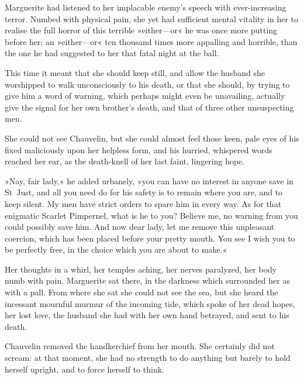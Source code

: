 Marguerite had listened to her implacable enemy's speech with ever-increasing terror. Numbed with physical pain, she yet had sufficient mental vitality in her to realise the full horror of this terrible »either\allowbreak---\allowbreak or« he was once more putting before her; an »either\allowbreak---\allowbreak or« ten thousand times more appalling and horrible, than the one he had suggested to her that fatal night at the ball.

This time it meant that she should keep still, and allow the husband she worshipped to walk unconsciously to his death, or that she should, by trying to give him a word of warning, which perhaps might even be unavailing, actually give the signal for her own brother's death, and that of three other unsuspecting men.

She could not see Chauvelin, but she could almost feel those keen, pale eyes of his fixed maliciously upon her helpless form, and his hurried, whispered words reached her ear, as the death-knell of her last faint, lingering hope.

»Nay, fair lady,« he added urbanely, »you can have no interest in anyone save in St~Just, and all you need do for his safety is to remain where you are, and to keep silent. My men have strict orders to spare him in every way. As for that enigmatic Scarlet Pimpernel, what is he to you? Believe me, no warning from you could possibly save him. And now dear lady, let me remove this unpleasant coercion, which has been placed before your pretty mouth. You see I wish you to be perfectly free, in the choice which you are about to make.«

Her thoughts in a whirl, her temples aching, her nerves paralyzed, her body numb with pain, Marguerite sat there, in the darkness which surrounded her as with a pall. From where she sat she could not see the sea, but she heard the incessant mournful murmur of the incoming tide, which spoke of her dead hopes, her lost love, the husband she had with her own hand betrayed, and sent to his death.

Chauvelin removed the handkerchief from her mouth. She certainly did not scream: at that moment, she had no strength to do anything but barely to hold herself upright, and to force herself to think.


